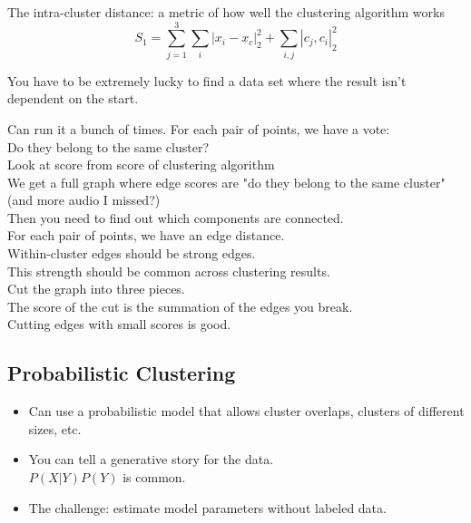 The intra-cluster distance: a metric of how well the clustering algorithm works
$$ S_1 = \sum_{j=1}^3 \sum_i |x_i - x_c|_2^2 + \sum_{i,j} |c_j, c_i|_2^2 $$ %

You have to be extremely lucky to find a data set where the result isn't dependent on the start.

Can run it a bunch of times. %
For each pair of points, we have a vote:  \hfill \\
Do they belong to the same cluster? \hfill \\
Look at score from score of clustering algorithm \hfill \\
We get a full graph where edge scores are "do they belong to the same 					cluster"  (and more audio I missed?) \hfill \\
Then you need to find out which components are connected.  \hfill \\

For each pair of points, we have an edge distance.  \hfill \\
Within-cluster edges should be strong edges.    \hfill \\
This strength should be common across clustering results.  \hfill \\
Cut the graph into three pieces.    \hfill \\
The score of the cut is the summation of the edges you break.   \hfill \\
Cutting edges with small scores is good.   \hfill \\


\subsection{Probabilistic Clustering}
\begin{itemize}
	\item Can use a probabilistic model that allows cluster overlaps, clusters of different sizes, etc.
	\item You can tell a generative story for the data.  \hfill \\
		$P(X|Y) P(Y)$ is common. 
	\item The challenge: estimate model parameters without labeled data. 
\end{itemize}

